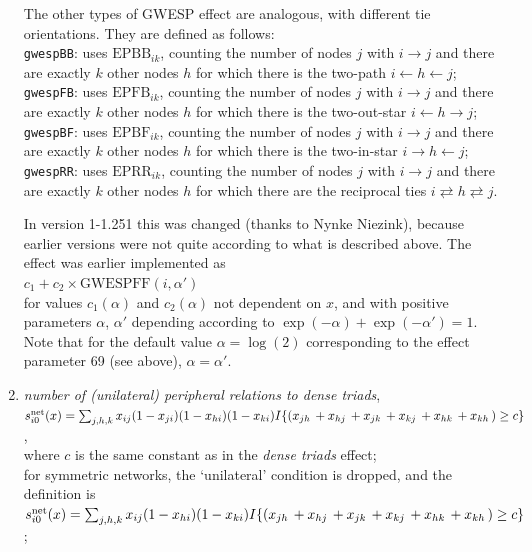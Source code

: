 \documentclass[a4paper,fleqn,11pt]{article}
\newcommand{\+}{\, + \,}
\newcommand{\vit}{\theenumi}
\begin{document}
\begin{enumerate}
The other types of GWESP effect are analogous, with
different tie orientations. They are defined as follows:\\
\texttt{gwespBB}: uses $\text{EPBB}_{ik}$, counting the number of nodes $j$
with $i \rightarrow j$ and there are exactly $k$ other
nodes $h$ for which there is the two-path $i \leftarrow h \leftarrow j$;\\
\texttt{gwespFB}: uses $\text{EPFB}_{ik}$, counting the number of nodes $j$
with $i \rightarrow j$ and there are exactly $k$ other
nodes $h$ for which there is the two-out-star $i \leftarrow h \rightarrow j$;\\
\texttt{gwespBF}: uses $\text{EPBF}_{ik}$, counting the number of nodes $j$
with $i \rightarrow j$ and there are exactly $k$ other
nodes $h$ for which there is the two-in-star $i \rightarrow h \leftarrow j$;\\
\texttt{gwespRR}: uses $\text{EPRR}_{ik}$, counting the number of nodes $j$
with $i \rightarrow j$ and there are exactly $k$ other
nodes $h$ for which there are the reciprocal ties $i \rightleftarrows h \rightleftarrows j$.

In version 1-1.251 this was changed (thanks to Nynke Niezink), because earlier versions
were not quite according to what is described above. The effect was earlier
implemented as\\
$c_1 + c_2 \times \text{GWESPFF}(i, \alpha')$\\
for values $c_1(\alpha)$ and $c_2(\alpha)$ not dependent on $x$, and with
positive parameters $\alpha$, $\alpha'$ depending according to
$\exp(-\alpha) + \exp(-\alpha') = 1$. Note that for the default value
$\alpha = \log(2)$ corresponding to the effect parameter 69 (see above), $\alpha = \alpha'$.

 \item {\em number of (unilateral) peripheral relations to dense triads},\\
 $s^{\rm net}_{i\vit}(x) =  \sum_{j,h,k} x_{ij} (1-x_{ji})(1-x_{hi})(1-x_{ki})
 I\{ (x_{jh}\,  + x_{hj}\, + x_{jk}\, + x_{kj}\, + x_{hk}\, + x_{kh}\,)\geq c \} \,$,\\
 where $c$ is the same constant as in the {\it dense triads} effect;\\
 for symmetric networks, the `unilateral' condition is dropped, and the definition is\\
 $s^{\rm net}_{i\vit}(x) =  \sum_{j,h,k} x_{ij} (1-x_{hi})(1-x_{ki})
 I\{ (x_{jh}\,  + x_{hj}\, + x_{jk}\, + x_{kj}\, + x_{hk}\, + x_{kh}\,)\geq c \} \,$;


\end{enumerate}
\end{document}
